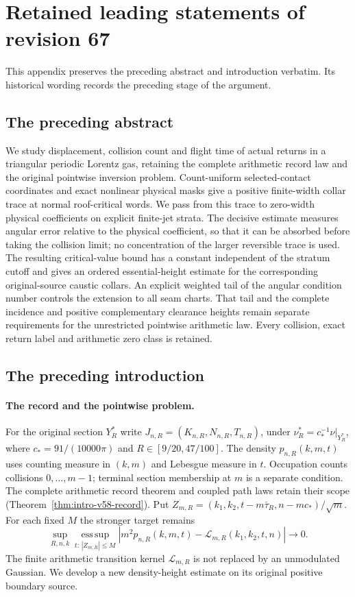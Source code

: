 \section{Retained leading statements of revision 67}
\label{app:v68-retained-front}
This appendix preserves the preceding abstract and introduction verbatim.
Its historical wording records the preceding stage of the argument.
\subsection*{The preceding abstract}

We study displacement, collision count and flight time of actual returns
in a triangular periodic Lorentz gas, retaining the complete arithmetic
record law and the original pointwise inversion problem. Count-uniform
selected-contact coordinates and exact nonlinear physical masks give a
positive finite-width collar trace at normal roof-critical words.
We pass from this trace to zero-width physical coefficients on explicit
finite-jet strata. The decisive estimate measures angular error relative
to the physical coefficient, so that it can be absorbed before taking the
collision limit; no concentration of the larger reversible trace is used.
The resulting critical-value bound has a constant independent of the
stratum cutoff and gives an ordered essential-height estimate for the
corresponding original-source caustic collars. An explicit weighted tail
of the angular condition number controls the extension to all seam charts.
That tail and the complete incidence and positive complementary clearance
heights remain separate requirements for the unrestricted pointwise
arithmetic law. Every collision, exact return label and arithmetic zero
class is retained.

\subsection*{The preceding introduction}


\paragraph{The record and the pointwise problem.}
For the original section $Y_R^*$ write
$J_{n,R}=(K_{n,R},N_{n,R},T_{n,R})$, under
$\nu_R^*=c_*^{-1}\nu|_{Y_R^*}$, where
$c_*=91/(10000\pi)$ and $R\in[9/20,47/100]$.
The density $p_{n,R}(k,m,t)$ uses counting measure in $(k,m)$ and
Lebesgue measure in $t$. Occupation counts collisions $0,\ldots,m-1$;
terminal section membership at $m$ is a separate condition.
The complete arithmetic record theorem and coupled path laws retain
their scope (Theorem~\ref{thm:intro-v58-record}). Put
$Z_{m,R}=(k_1,k_2,t-m\bar\tau_R,n-mc_*)/\sqrt m$.
For each fixed $M$ the stronger target remains
\[
 \sup_{R,n,k}\operatorname*{ess\,sup}_{t:\,|Z_{m,R}|\le M}
 \left|m^2p_{n,R}(k,m,t)-\mathcal L_{m,R}(k_1,k_2,t,n)\right|
                         \longrightarrow0.
\]
The finite arithmetic transition kernel $\mathcal L_{m,R}$ is not
replaced by an unmodulated Gaussian. We develop a new density-height
estimate on its original positive boundary source.

